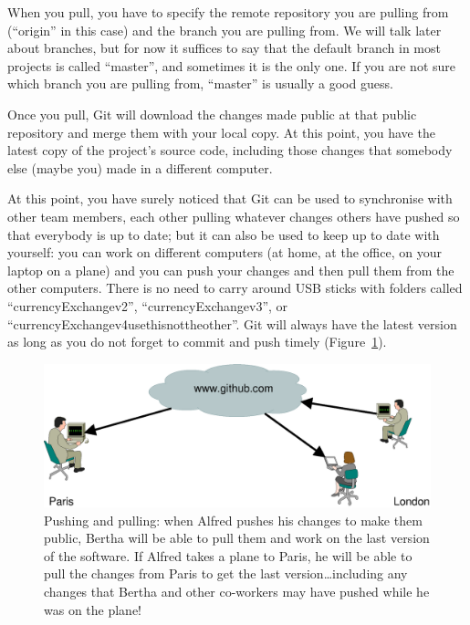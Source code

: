 When you pull, you have to specify the remote repository you are
pulling from (``origin'' in this case) and the branch you are pulling
from. We will talk later about branches, but for now it suffices to
say that the default branch in most projects is called ``master'', and
sometimes it is the only one. If you are not sure which branch you are
pulling from, ``master'' is usually a good guess.

Once you pull, Git will download the changes made public at that
public repository and merge them with your local copy. At this point,
you have the latest copy of the project's source code, including those
changes that somebody else (maybe you) made in a different computer. 

At this point, you have surely noticed that Git can be used to
synchronise with other team members, each other pulling whatever
changes others have pushed so that everybody is up to date; but it can
also be used to keep up to date with yourself: you can work on
different computers (at home, at the office, on your laptop on a
plane) and you can push your changes and then pull them from the other
computers. There is no need to carry around USB sticks with folders
called ``currencyExchangev2'', ``currencyExchangev3'', or
``currencyExchangev4usethisnottheother''. Git will always have the
latest version as long as you do not forget to commit and push
timely (Figure~\ref{fig:pushpull}). 

\begin{figure}[htbp!]
  \centering
  \includegraphics[width=\textwidth]{gfx/pushpull}
  \caption{Pushing and pulling: when Alfred pushes his changes to make
    them public, Bertha will be able to pull them and work on the last
    version of the software. If Alfred takes a plane to Paris, he will
    be able to pull the changes from Paris to get the last
    version\ldots including any changes that Bertha and other
    co-workers may have pushed while he was on the plane!}
  \label{fig:pushpull}
\end{figure}

